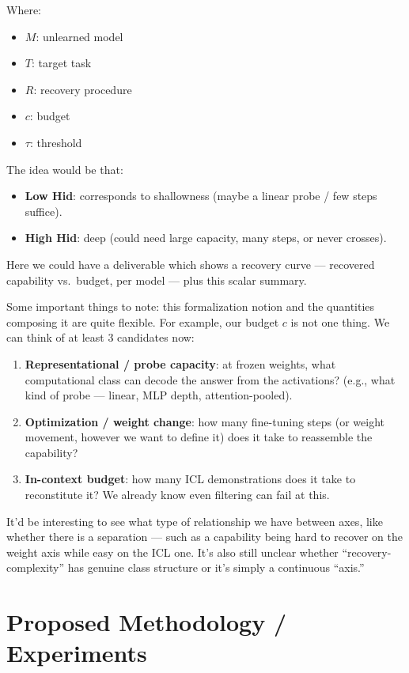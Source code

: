 \documentclass[11pt]{article}
\begin{document}
Where:
\begin{itemize}
  \item $M$: unlearned model
  \item $T$: target task
  \item $R$: recovery procedure
  \item $c$: budget
  \item $\tau$: threshold
\end{itemize}

The idea would be that:
\begin{itemize}
  \item \textbf{Low Hid}: corresponds to shallowness (maybe a linear probe / few steps suffice).
  \item \textbf{High Hid}: deep (could need large capacity, many steps, or never crosses).
\end{itemize}

Here we could have a deliverable which shows a recovery curve --- recovered
capability vs.\ budget, per model --- plus this scalar summary.

Some important things to note: this formalization notion and the quantities
composing it are quite flexible. For example, our budget $c$ is not one thing.
We can think of at least 3 candidates now:

\begin{enumerate}
  \item \textbf{Representational / probe capacity}: at frozen weights, what
  computational class can decode the answer from the activations? (e.g., what
  kind of probe --- linear, MLP depth, attention-pooled).
  \item \textbf{Optimization / weight change}: how many fine-tuning steps (or
  weight movement, however we want to define it) does it take to reassemble the
  capability?
  \item \textbf{In-context budget}: how many ICL demonstrations does it take to
  reconstitute it? We already know even filtering can fail at this.
\end{enumerate}

It'd be interesting to see what type of relationship we have between axes, like
whether there is a separation --- such as a capability being hard to recover on
the weight axis while easy on the ICL one. It's also still unclear whether
``recovery-complexity'' has genuine class structure or it's simply a continuous
``axis.''

\section*{Proposed Methodology / Experiments}
\end{document}
